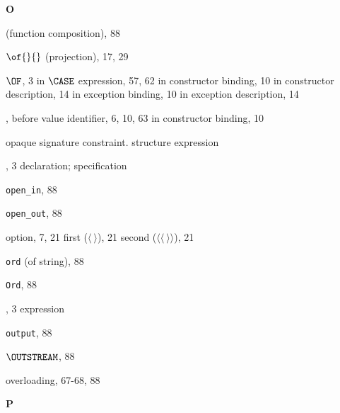 \begin{theindex}
\parbox{64mm}{\hfil{\large\bf O}\hfil}

\indexspace

\item {} (function composition), 88
\item $\of{}{}$ (projection), 17, 29
\item $\OF$, 3
\subitem in $\CASE$ expression, 57, 62
\subitem in constructor binding, 10
\subitem in constructor description, 14
\subitem in exception binding, 10
\subitem in exception description, 14
\item \OP,
\subitem before value identifier, 6, 10, 63
\subitem in constructor binding, 10
\item opaque signature constraint. \see structure expression
\item \OPEN, 3 
\subitem \seealso declaration; specification
\item \verb+open_in+, 88
\item \verb+open_out+, 88
\item option, 7, 21
\subitem first ($\langle\ \rangle$), 21
\subitem second ($\langle\langle\ \rangle\rangle$), 21
\item {\tt ord} (of string), 88
\item {\tt Ord}, 88
\item \ORELSE, 3
\subitem \seealso expression
\item {\tt output}, 88
\item $\OUTSTREAM$, 88
\item overloading, 67-68, 88
\indexspace

\parbox{64mm}{\hfil{\large\bf P}\hfil}

\indexspace


\end{theindex}
